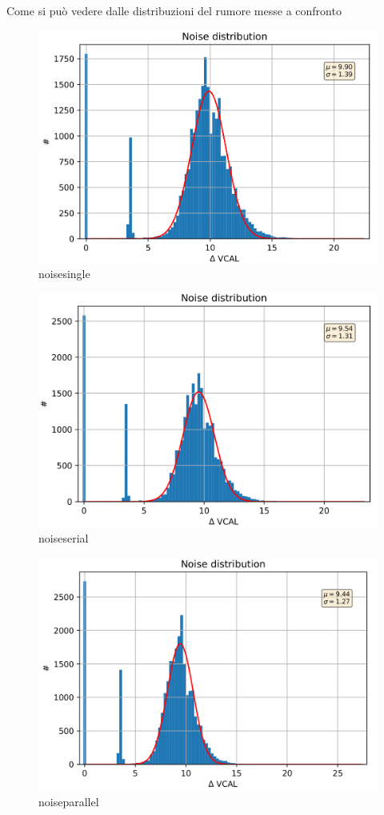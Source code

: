 Come si può vedere dalle distribuzioni del rumore messe a confronto
\begin{figure}
\centering
\includegraphics[scale=.3]{Immagini/NoiseSingle}
\caption{noisesingle}
\label{noisesingle}
\end{figure}

\begin{figure}
\centering
\includegraphics[scale=.3]{Immagini/NoiseSerial}
\caption{noiseserial}
\label{noiseserial}
\end{figure}

\begin{figure}
\centering
\includegraphics[scale=.3]{Immagini/NoiseParallel}
\caption{noiseparallel}
\label{noiseparallel}
\end{figure}

